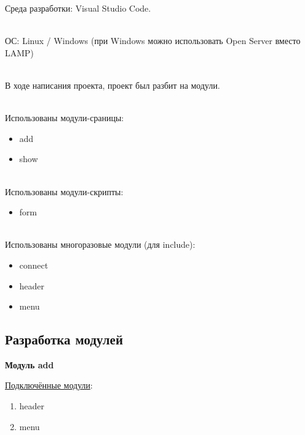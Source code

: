 Среда разработки: Visual Studio Code.

\hspace{0pt}\\

ОС: Linux / Windows (при Windows можно использовать Open Server вместо LAMP)

\hspace{0pt}\\

В ходе написания проекта, проект был разбит на модули.

\hspace{0pt}\\

Использованы модули-сраницы: 

\begin{itemize}
    \item add
    \item show
\end{itemize}

\hspace{0pt}\\

Использованы модули-скрипты: 

\begin{itemize}
    \item form
\end{itemize}

\hspace{0pt}\\

Использованы многоразовые модули (для include): 

\begin{itemize}
    \item connect
    \item header
    \item menu
\end{itemize}

\newpage

\subsection{Разработка модулей}

\textbf{Модуль add}

\underline{Подключённые модули}:

\begin{enumerate}
    \item header
    \item menu
\end{enumerate}

